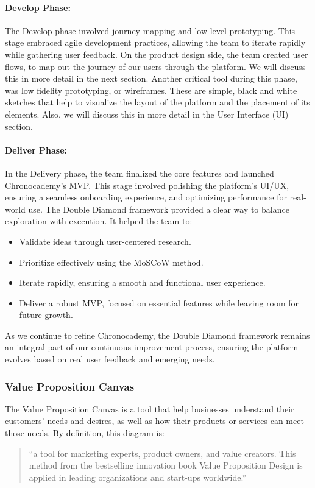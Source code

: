 \paragraph{Develop Phase:}
The Develop phase involved journey mapping and low level prototyping.
This stage embraced agile development practices, allowing the team to iterate rapidly while gathering user feedback.
On the product design side, the team created user flows, to map out the journey of our users through the platform.
We will discuss this in more detail in the next section.\newline
Another critical tool during this phase, was low fidelity prototyping, or wireframes.
These are simple, black and white sketches that help to visualize the layout of the platform and the placement of its elements.
Also, we will discuss this in more detail in the User Interface (UI) section.\newline

\paragraph{Deliver Phase:}
In the Delivery phase, the team finalized the core features and launched Chronocademy's MVP. This stage involved polishing the platform’s UI/UX, ensuring a seamless onboarding experience, and optimizing performance for real-world use.
The Double Diamond framework provided a clear way to balance exploration with execution.
It helped the team to:
\begin{itemize}
    \item Validate ideas through user-centered research.
    \item Prioritize effectively using the MoSCoW method.
    \item Iterate rapidly, ensuring a smooth and functional user experience.
    \item Deliver a robust MVP, focused on essential features while leaving room for future growth.
\end{itemize}
As we continue to refine Chronocademy, the Double Diamond framework remains an integral part of our continuous improvement process, ensuring the platform evolves based on real user feedback and emerging needs.
\clearpage

\subsubsection{Value Proposition Canvas}\label{subsubsec:value-proposition-canvas}
The Value Proposition Canvas is a tool that help businesses understand their customers' needs and desires, as well as how their products or services can meet those needs.
By definition, this diagram is:
\begin{quote}
    ``a tool for marketing experts, product
    owners, and value creators.
    This method from the bestselling innovation
    book Value Proposition Design is applied in leading organizations and
    start-ups worldwide.''~\cite[Value Proposition Canvas]{valuePropositionCanvas}
\end{quote}


